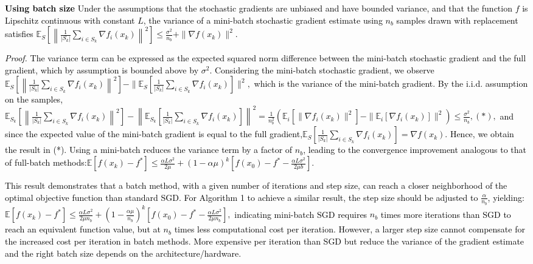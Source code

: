 \documentclass[a4paper,6pt]{extarticle}
\newcommand{\mybox}[2]{
    \begin{tcolorbox}[colback=color!5!white, colframe=color!75!black, boxsep=2pt, top=1pt, bottom=1pt, left=2pt, right=2pt, arc=3pt, outer arc=3pt, title={\textbf{#1}}]
    {\fontsize{5pt}{5pt}\selectfont \textcolor{black}{#2}}
    \end{tcolorbox}
}
\begin{document}
\begin{multicols}{2}

\mybox{Variance reduction techniques}{

\textbf{Using batch size} Under the assumptions that the stochastic gradients are unbiased and have bounded variance, and that the function \( f \) is Lipschitz continuous with constant \( L \), the variance of a mini-batch stochastic gradient estimate using \( n_b \) samples drawn with replacement satisfies
$\mathbb{E}_S\left[\left\| \frac{1}{|S_k|} \sum_{i \in S_k} \nabla f_i(x_k) \right\|^2\right] \leq \frac{\sigma^2}{n_b} + \|\nabla f(x_k)\|^2.$

\textit{Proof.} The variance term can be expressed as the expected squared norm difference between the mini-batch stochastic gradient and the full gradient, which by assumption is bounded above by \( \sigma^2 \). Considering the mini-batch stochastic gradient, we observe
$\mathbb{E}_S\left[\left\| \frac{1}{|S_k|} \sum_{i \in S_k} \nabla f_i(x_k) \right\|^2\right] - \|\mathbb{E}_S\left[ \frac{1}{|S_k|} \sum_{i \in S_k} \nabla f_i(x_k)\right]\|^2,$
which is the variance of the mini-batch gradient. By the i.i.d. assumption on the samples,
$\mathbb{E}_{S_k}\left[\left\| \frac{1}{|S_k|} \sum_{i \in S_k} \nabla f_i(x_k) \right\|^2\right] - \left\| \mathbb{E}_{S_k}\left[ \frac{1}{|S_k|} \sum_{i \in S_k} \nabla f_i(x_k) \right] \right\|^2 = \frac{1}{n_b^2}\left(\mathbb{E}_i\left[\|\nabla f_i(x_k)\|^2\right] - \|\mathbb{E}_i[\nabla f_i(x_k)]\|^2\right) \leq \frac{\sigma^2}{n_b}, (*),$
and since the expected value of the mini-batch gradient is equal to the full gradient,$\mathbb{E}_S\left[ \frac{1}{|S_k|} \sum_{i \in S_k} \nabla f_i(x_k)\right] = \nabla f(x_k).$
Hence, we obtain the result in (*). Using a mini-batch reduces the variance term by a factor of \( n_b \), leading to the convergence improvement analogous to that of full-batch methods:$\mathbb{E}[f(x_k) - f^*] \leq \frac{\alpha L \sigma^2}{2\mu} + (1 - \alpha \mu)^k \left[ f(x_0) - f^* - \frac{\alpha L \sigma^2}{2\mu b} \right].$

This result demonstrates that a batch method, with a given number of iterations and step size, can reach a closer neighborhood of the optimal objective function than standard SGD. For Algorithm 1 to achieve a similar result, the step size should be adjusted to \(\frac{\alpha}{n_b}\), yielding:
$\mathbb{E}[f(x_k) - f^*] \leq \frac{\alpha L \sigma^2}{2 \mu n_b} + \left(1 - \frac{\alpha \mu}{n_b}\right)^k \left[f(x_0) - f^* - \frac{\alpha L \sigma^2}{2 \mu n_b}\right],$
indicating mini-batch SGD requires \(n_b\) times more iterations than SGD to reach an equivalent function value, but at \(n_b\) times less computational cost per iteration. However, a larger step size cannot compensate for the increased cost per iteration in batch methods. More expensive per iteration than SGD but reduce the variance of the gradient estimate and the right batch size depends on the architecture/hardware.

}
\end{multicols}
\end{document}
